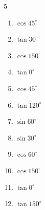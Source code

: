 \begin{multicols}{5}
\begin{enumerate}

  \item $\displaystyle \cos{45^\circ}$


  \item $\displaystyle \tan{30^\circ}$


\columnbreak %

  \item $\displaystyle \cos{150^\circ}$


  \item $\displaystyle \tan{0^\circ}$

        \phantom{$\displaystyle =0$}

  \item $\displaystyle \cos{45^\circ}$


  \item $\displaystyle \tan{120^\circ}$


  \item $\displaystyle \sin{60^\circ}$


  \item $\displaystyle \sin{30^\circ}$


  \item $\displaystyle \cos{60^\circ}$


  \item $\displaystyle \cos{150^\circ}$


  \item $\displaystyle \tan{0^\circ}$

        \phantom{$\displaystyle =0$}

  \item $\displaystyle \tan{150^\circ}$



\end{enumerate}
\end{multicols}
